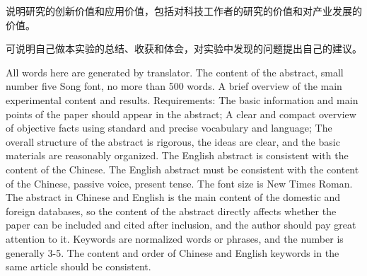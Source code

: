 \documentclass{thuemp}
\begin{document}
说明研究的创新价值和应用价值，包括对科技工作者的研究的价值和对产业发展的价值。

可说明自己做本实验的总结、收获和体会，对实验中发现的问题提出自己的建议。



\renewcommand\refname{\heiti\wuhao\centerline{参考文献}\global\def\refname{参考文献}}
\vskip 12pt

\let\OLDthebibliography\thebibliography
\renewcommand\thebibliography[1]{
  \OLDthebibliography{#1}
  \setlength{\parskip}{0pt}
  \setlength{\itemsep}{0pt plus 0.3ex}
}

{
\renewcommand{\baselinestretch}{0.9}
\liuhao


}

\begin{empAbstractEn}
All words here are generated by translator. The content of the abstract, small number five Song font, no more than 500 words. A brief overview of the main experimental content and results. Requirements: The basic information and main points of the paper should appear in the abstract; A clear and compact overview of objective facts using standard and precise vocabulary and language; The overall structure of the abstract is rigorous, the ideas are clear, and the basic materials are reasonably organized. The English abstract is consistent with the content of the Chinese. The English abstract must be consistent with the content of the Chinese, passive voice, present tense. The font size is New Times Roman. The abstract in Chinese and English is the main content of the domestic and foreign databases, so the content of the abstract directly affects whether the paper can be included and cited after inclusion, and the author should pay great attention to it. Keywords are normalized words or phrases, and the number is generally 3-5. The content and order of Chinese and English keywords in the same article should be consistent.
\end{empAbstractEn}
\end{document}
